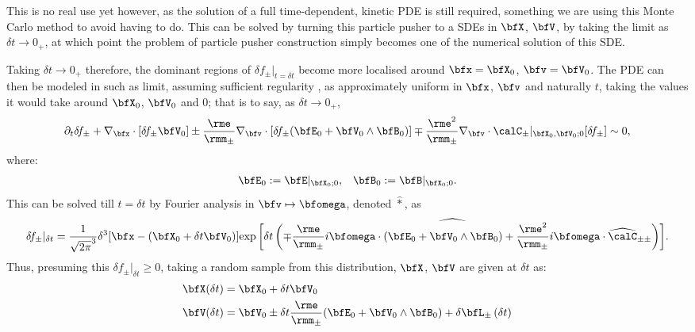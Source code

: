     This is no real use yet however, as the solution of a full time-dependent, kinetic PDE is still required, something we are using this Monte Carlo method to avoid having to do. This can be solved by turning this particle pusher to a SDEs in $\bfX$, $\bfV$, by taking the limit as $\delta t  \rightarrow  0_{+}$, at which point the problem of particle pusher construction simply becomes one of the numerical solution of this SDE.
    
    Taking $\delta t  \rightarrow  0_{+}$ therefore, the dominant regions of $\delta\!f_{\pm}|_{t = \delta t}$ become more localised around $\bfx  =  \bfX_{0}$, $\bfv  =  \bfV_{0}$. The PDE can then be modeled in such as limit, assuming sufficient regularity , as approximately uniform in $\bfx$, $\bfv$ and naturally $t$, taking the values it would take around $\bfX_{0}$, $\bfV_{0}$ and $0$; that is to say, as $\delta t  \rightarrow  0_{+}$,
    \begin{equation}
        \partial_{t}\delta\!f_{\pm} + \nabla_{\bfx}\cdot[\delta\!f_{\pm}\bfV_{0}] \pm \frac{\rme}{\rmm_{\pm}}\nabla_{\bfv}\cdot[\delta\!f_{\pm}(\bfE_{0} + \bfV_{0}\wedge\bfB_{0})] \mp \frac{\rme^{2}}{\rmm_{\pm}}\nabla_{\bfv}\cdot\calC_{\pm}|_{\bfX_{0}, \bfV_{0}; 0}[\delta\!f_{\pm}]  \sim  0,
    \end{equation}
    where:
    \begin{align}
        \bfE_{0}  :=  \bfE|_{\bfX_{0}; 0},  &&
        \bfB_{0}  :=  \bfB|_{\bfX_{0}; 0}.
    \end{align}
    This can be solved till $t  =  \delta t$ by Fourier analysis in $\bfv  \mapsto  \bfomega$, denoted $\widehat{*}$, as
    \begin{equation}
        \delta\!f_{\pm}|_{\delta t}  =  \frac{1}{\sqrt{2\pi}^{3}}\delta^{3}[\bfx - (\bfX_{0} + \delta t\bfV_{0})]\widehat{\exp\left[\delta t\left(\mp\frac{\rme}{\rmm_{\pm}}i\bfomega\cdot(\bfE_{0} + \bfV_{0}\wedge\bfB_{0}) + \frac{\rme^{2}}{\rmm_{\pm}}i\bfomega\cdot\widehat{\calC}_{\pm\pm}\right)\right]}.
    \end{equation}
    Thus, presuming this $\delta\!f_{\pm}|_{\delta t}  \geq  0$, taking a random sample from this distribution, $\bfX$, $\bfV$ are given at $\delta t$ as:
    \begin{align}
        \bfX(\delta t)  &=  \bfX_{0} + \delta t\bfV_{0}  \\
        \bfV(\delta t)  &=  \bfV_{0} \pm \delta t\frac{\rme}{\rmm_{\pm}}(\bfE_{0} + \bfV_{0}\wedge\bfB_{0}) + \delta\bfL_{\pm}\left(\delta t\right)
    \end{align}

